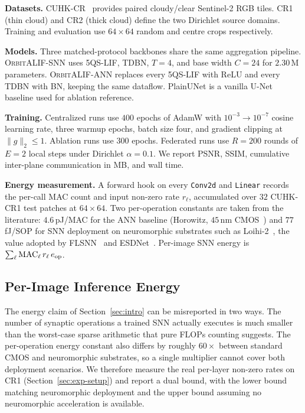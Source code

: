 \documentclass[conference]{IEEEtran}
\newcommand{\OrbitALIF}{\textsc{OrbitALIF}}
\newcommand{\FQS}{5QS}
\begin{document}
\textbf{Datasets.} CUHK-CR~\cite{ref:cuhkcr} provides paired
cloudy/clear Sentinel-2 RGB tiles. CR1 (thin cloud) and CR2 (thick
cloud) define the two Dirichlet source domains. Training and
evaluation use $64\!\times\!64$ random and centre crops
respectively.

\textbf{Models.} Three matched-protocol backbones share the same
aggregation pipeline. \OrbitALIF{}-SNN uses \FQS{}-LIF, TDBN,
$T\!=\!4$, and base width $C\!=\!24$ for $2.30$\,M parameters.
\OrbitALIF{}-ANN replaces every \FQS{}-LIF with ReLU and every TDBN
with BN, keeping the same dataflow. PlainUNet is a vanilla U-Net
baseline used for ablation reference.

\textbf{Training.} Centralized runs use $400$ epochs of AdamW with
$10^{-3}\!\to\!10^{-7}$ cosine learning rate, three warmup epochs,
batch size four, and gradient clipping at $\|g\|_2\!\le\!1$.
Ablation runs use $300$ epochs. Federated runs use $R\!=\!200$
rounds of $E\!=\!2$ local steps under Dirichlet
$\alpha\!=\!0.1$. We report PSNR, SSIM, cumulative inter-plane
communication in MB, and wall time.

\textbf{Energy measurement.} A forward hook on every
\texttt{Conv2d} and \texttt{Linear} records the per-call MAC count
and input non-zero rate $r_\ell$, accumulated over $32$ CUHK-CR1
test patches at $64\!\times\!64$. Two per-operation constants are
taken from the literature: $4.6$\,pJ/MAC for the ANN baseline
(Horowitz, $45$\,nm CMOS~\cite{ref:horowitz2014}) and $77$\,fJ/SOP
for SNN deployment on neuromorphic substrates such as
Loihi-2~\cite{ref:loihi}, the value adopted by
FLSNN~\cite{ref:flsnn} and ESDNet~\cite{ref:esdnet}. Per-image SNN
energy is $\sum_\ell \mathrm{MAC}_\ell\,r_\ell\,e_{\rm op}$.

\subsection{Per-Image Inference Energy}\label{sec:exp-energy}

The energy claim of Section~\ref{sec:intro} can be misreported in
two ways. The number of synaptic operations a trained SNN actually
executes is much smaller than the worst-case sparse arithmetic
that pure FLOPs counting suggests. The per-operation energy
constant also differs by roughly $60\!\times$ between standard
CMOS and neuromorphic substrates, so a single multiplier cannot
cover both deployment scenarios. We therefore measure the real
per-layer non-zero rates on CR1 (Section~\ref{sec:exp-setup}) and
report a dual bound, with the lower bound matching neuromorphic
deployment and the upper bound assuming no neuromorphic
acceleration is available.
\end{document}
